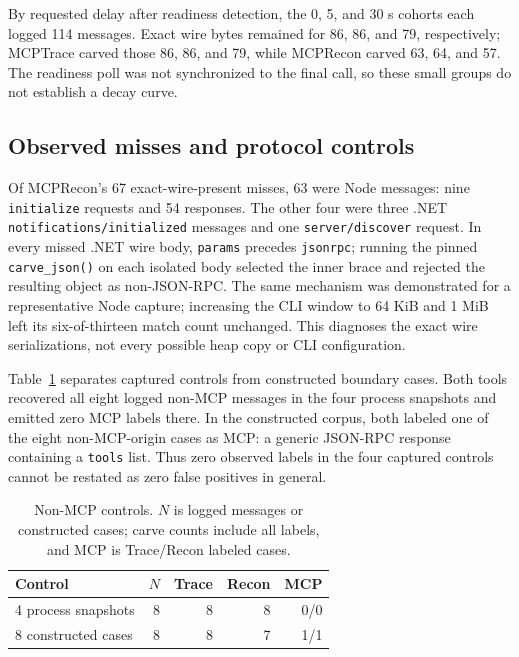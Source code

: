\documentclass[conference,10pt]{IEEEtran}
\begin{document}
By requested delay after readiness detection, the 0, 5, and 30 s cohorts each logged 114 messages. Exact wire bytes remained for 86, 86, and 79, respectively; MCPTrace carved those 86, 86, and 79, while MCPRecon carved 63, 64, and 57. The readiness poll was not synchronized to the final call, so these small groups do not establish a decay curve.

\subsection{Observed misses and protocol controls}
Of MCPRecon's 67 exact-wire-present misses, 63 were Node messages: nine \texttt{initialize} requests and 54 responses. The other four were three .NET \texttt{notifications/initialized} messages and one \texttt{server/discover} request. In every missed .NET wire body, \texttt{params} precedes \texttt{jsonrpc}; running the pinned \texttt{carve\_json()} on each isolated body selected the inner brace and rejected the resulting object as non-JSON-RPC. The same mechanism was demonstrated for a representative Node capture; increasing the CLI window to 64 KiB and 1 MiB left its six-of-thirteen match count unchanged. This diagnoses the exact wire serializations, not every possible heap copy or CLI configuration.

Table~\ref{tab:negative} separates captured controls from constructed boundary cases. Both tools recovered all eight logged non-MCP messages in the four process snapshots and emitted zero MCP labels there. In the constructed corpus, both labeled one of the eight non-MCP-origin cases as MCP: a generic JSON-RPC response containing a \texttt{tools} list. Thus zero observed labels in the four captured controls cannot be restated as zero false positives in general.

\begin{table}[t]
\caption{Non-MCP controls. $N$ is logged messages or constructed cases; carve counts include all labels, and MCP is Trace/Recon labeled cases.}
\label{tab:negative}
\centering
\footnotesize
\setlength{\tabcolsep}{3pt}
\begin{tabular}{lrrrr}
\toprule
Control & $N$ & Trace & Recon & MCP \\
\midrule
4 process snapshots & 8 & 8 & 8 & 0/0 \\
8 constructed cases & 8 & 8 & 7 & 1/1 \\
\bottomrule
\end{tabular}
\end{table}
\end{document}
